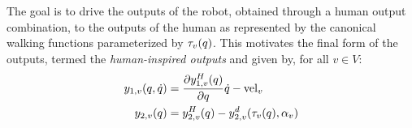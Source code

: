  The goal is to drive the outputs of the robot, obtained through a human output combination, to the outputs of the human as represented by the canonical walking functions parameterized by $\tau_v(q)$. This motivates the final form of the outputs, termed the \textit{human-inspired outputs} and given by, for all $v \in V$:
\begin{align}
 y_{1,v}(q,\dot {q}) &= \frac{\partial y^H_{1,v} (q)}{\partial q} \dot {q} -\mathrm{vel}_v\\
 y_{2,v}(q) &= y^H_{2,v}(q) - y^d_{2,v}(\tau_v(q), \alpha_v)
\end{align}



